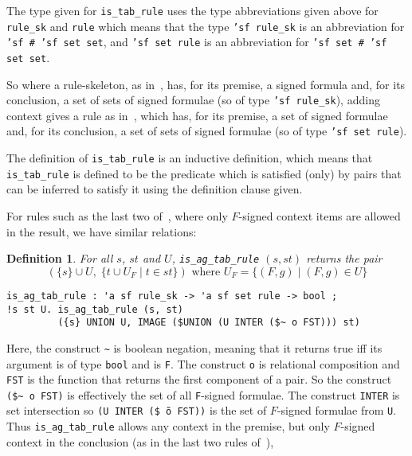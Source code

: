 \documentclass[a4paper]{article}
\newtheorem{definition}{Definition}
\begin{document}
The type given for \texttt{is\_tab\_rule} uses the type abbreviations
given above for \texttt{rule\_sk} and \texttt{rule} which means that 
the type \texttt{'sf rule\_sk} is an abbreviation for
\texttt{'sf \# 'sf set set}, and
\texttt{'sf set rule} is an abbreviation for \texttt{'sf set \# 'sf
  set set}.

So where a rule-skeleton,
as in~\cite[Fig.\ 1.3]{fitting-dual-tableau}, has, for its premise,
a signed formula and, for its conclusion, a set of sets of signed formulae
(so of type \texttt{'sf rule\_sk}),
adding context gives a rule as
in~\cite[Fig.\ 1.6]{fitting-dual-tableau},
which has, for its premise, a set of signed formulae and,
for its conclusion, a set of sets of signed formulae
(so of type \texttt{'sf set rule}).

The definition of \texttt{is\_tab\_rule} is an inductive definition,
which means that \texttt{is\_tab\_rule} is defined to be the predicate which
is satisfied (only) by pairs that can be inferred to satisfy it
using the definition clause given.

For rules such as the last two of~\cite[Fig.\ 1.6]{fitting-dual-tableau},
where only $F$-signed context items are allowed in the
result, we have similar relations:
\begin{definition}
  For all $s$, $st$ and $U$,
  \texttt{is\_ag\_tab\_rule} $(s, st)$
  returns the pair
  \[
    (\{s\} \cup U, \;\{t \cup U_F \mid t \in st \})
    \mbox{ where }  U_F =  \{(F, g) \mid (F, g) \in U\}
  \]
\begin{verbatim}
is_ag_tab_rule : 'a sf rule_sk -> 'a sf set rule -> bool ;
!s st U. is_ag_tab_rule (s, st)
         ({s} UNION U, IMAGE ($UNION (U INTER ($~ o FST))) st)
\end{verbatim}
\end{definition}

Here, the construct
\verb!~! is boolean negation, meaning that it returns true iff its
argument is of type \texttt{bool} and is \texttt{F}.
The construct
\texttt{o} is relational composition
and \texttt{FST} is the function that returns the first
component of a pair. So the construct
\verb!($~ o FST)!
is effectively the set of all
\texttt{F}-signed formulae.
The construct \texttt{INTER} is set intersection so
\texttt{(U INTER (\$\~\ o FST))}
is the set of $F$-signed formulae from
\texttt{U}.
Thus
\texttt{is\_ag\_tab\_rule} allows any context in the premise, but only
$F$-signed context in the conclusion (as in the last two rules of~\cite[Figure~1.6]{fitting-dual-tableau}),
\end{document}
